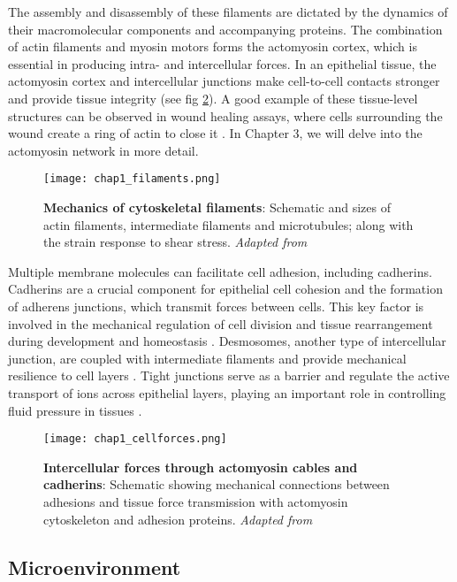 The assembly and disassembly of these filaments are dictated by the dynamics of their macromolecular components and accompanying proteins. The combination of actin filaments and myosin motors forms the actomyosin cortex, which is essential in producing intra- and intercellular forces. In an epithelial tissue, the actomyosin cortex and intercellular junctions make cell-to-cell contacts stronger and provide tissue integrity \cite{braga2016} (see fig \ref{fig_1_3}). A good example of these tissue-level structures can be observed in wound healing assays, where cells surrounding the wound create a ring of actin to close it \cite{brugues2014}. In Chapter 3, we will delve into the actomyosin network in more detail.

\begin{figure}[h!]
	\centering
	\texttt{[image: chap1\_filaments.png]}
	\caption{\label{fig_1_3b} \textbf{Mechanics of cytoskeletal filaments}: Schematic and sizes of actin filaments, intermediate filaments and microtubules; along with the strain response to shear stress. \textit{Adapted from \cite{leggett2021}}}
\end{figure}

Multiple membrane molecules can facilitate cell adhesion, including cadherins. Cadherins are a crucial component for epithelial cell cohesion and the formation of adherens junctions, which transmit forces between cells. This key factor is involved in the mechanical regulation of cell division and tissue rearrangement during development and homeostasis \cite{godard2019, mertz2013}. Desmosomes, another type of intercellular junction, are coupled with intermediate filaments and provide mechanical resilience to cell layers \cite{hatzfeld2017, latorre2018}. Tight junctions serve as a barrier and regulate the active transport of ions across epithelial layers, playing an important role in controlling fluid pressure in tissues \cite{marchiando2010, chan2020}.

\begin{figure}[H]
	\centering
	\texttt{[image: chap1\_cellforces.png]}
	\caption{\label{fig_1_3} \textbf{Intercellular forces through actomyosin cables and cadherins}: Schematic showing mechanical connections between adhesions and tissue force transmission with actomyosin cytoskeleton and adhesion proteins. \textit{Adapted from \cite{ladoux2017}}}
\end{figure}

\hypertarget{microenvironment}{%
	\subsection{Microenvironment}\label{microenvironment}}

